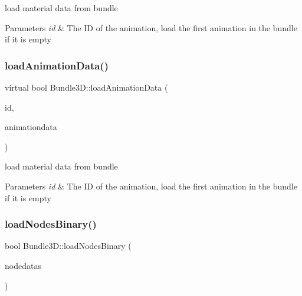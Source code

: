 load material data from bundle 
\begin{DoxyParams}{Parameters}
{\em id} & The ID of the animation, load the first animation in the bundle if it is empty \\
\hline
\end{DoxyParams}
\mbox{\label{classBundle3D_a7b652fc7f56623ad51a4c84a6c68d8c9}} 
\subsubsection{\texorpdfstring{load\+Animation\+Data()}{loadAnimationData()}\hspace{0.1cm}{\footnotesize\ttfamily [2/2]}}
{\footnotesize\ttfamily virtual bool Bundle3\+D\+::load\+Animation\+Data (\begin{DoxyParamCaption}\item[{const std\+::string \&}]{id,  }\item[{\hyperlink{structAnimation3DData}{Animation3\+D\+Data} $\ast$}]{animationdata }\end{DoxyParamCaption})\hspace{0.3cm}{\ttfamily [virtual]}}

load material data from bundle 
\begin{DoxyParams}{Parameters}
{\em id} & The ID of the animation, load the first animation in the bundle if it is empty \\
\hline
\end{DoxyParams}
\mbox{\label{classBundle3D_a83744280068184dce4d36dc6260e69b8}} 
\subsubsection{\texorpdfstring{load\+Nodes\+Binary()}{loadNodesBinary()}\hspace{0.1cm}{\footnotesize\ttfamily [1/2]}}
{\footnotesize\ttfamily bool Bundle3\+D\+::load\+Nodes\+Binary (\begin{DoxyParamCaption}\item[{\hyperlink{structNodeDatas}{Node\+Datas} \&}]{nodedatas }\end{DoxyParamCaption})\hspace{0.3cm}{\ttfamily [protected]}}

